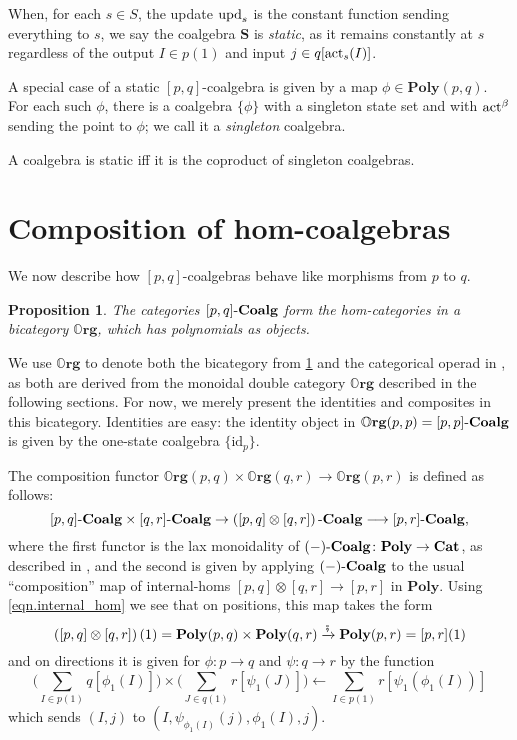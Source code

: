 \documentclass[11pt, one side, article]{memoir}
\theoremstyle{definition}
\theoremstyle{plain}
\newtheorem{proposition}[definitionx]{Proposition}
\newenvironment{example}
  {\pushQED{\qed}\renewcommand{\qedsymbol}{$\lozenge$}\examplex}
  {\popQED\endexamplex}
\newcommand{\Cat}[1]{\mathbf{#1}}%
\newcommand{\id}{\mathrm{id}}
\newcommand{\then}{\mathbin{\fatsemi}}
\newcommand{\too}{\longrightarrow}
\newcommand{\To}[2][]{\xrightarrow[#1]{#2}}
\newcommand{\from}{\leftarrow}
\newcommand{\tn}[1]{\textnormal{#1}}
\newcommand{\smcat}{\Cat{Cat}}
\newcommand{\act}{\tn{act}}
\newcommand{\upd}{\tn{upd}}
\newcommand{\poly}{\Cat{Poly}}
\newcommand{\0}{\textsf{0}}
\newcommand{\1}{\tn{\textsf{1}}}
\newcommand{\coalg}{\tn{-}\Cat{Coalg}}
\newcommand{\org}{{\mathbb{O}\Cat{rg}}}
\renewcommand{\S}{{\Cat{S}}}
\newcommand{\idcoalg}[1]{{\{\id_{#1}\}}}
\newcommand{\dnote}[1]{{\color{blue}David says:}~#1\quad{\color{blue}$\lozenge$}}
\begin{document}
When, for each $s \in S$, the update $\upd_s$ is the constant function sending everything to $s$, we say the coalgebra $\S$ is \emph{static}, as it remains constantly at $s$ regardless of the output $I \in p(1)$ and input $j\in q[\act_s(I)]$.

\begin{example}\label{ex.single_state}
A special case of a static $[p,q]$-coalgebra is given by a map $\phi \in \poly(p,q)$. For each such $\phi$, there is a coalgebra $\{\phi\}$ with a singleton state set and with $\act^\beta$ sending the point to $\phi$; we call it a \emph{singleton} coalgebra. 

A coalgebra is static iff it is the coproduct of singleton coalgebras.
\end{example}


\section{Composition of hom-coalgebras}\label{sec.compose_hom_coalg}



We now describe how $[p,q]$-coalgebras behave like morphisms from $p$ to $q$.

\begin{proposition}\label{prop.def_org}
The categories $[p,q]\coalg$ form the hom-categories in a bicategory $\org$, which has polynomials as objects.
\end{proposition}

We use $\org$ to denote both the bicategory from \cref{prop.def_org} and the categorical operad in \cite[Definition 2.19]{spivak2021learners}, as both are derived from the monoidal double category $\org$ described in the following sections. For now, we merely present the identities and composites in this bicategory. Identities are easy: the identity object in $\org(p,p)=[p,p]\coalg$ is given by the one-state coalgebra $\idcoalg{p}$. 

The composition functor $\org(p,q)\times\org(q,r)\too\org(p,r)$ is defined as follows:
\[[p,q]\coalg \times [q,r]\coalg \to \left([p,q] \otimes [q,r]\right)\coalg \too [p,r]\coalg,\]
where the first functor is the lax monoidality of $(-)\coalg\colon\poly \to \smcat$, as described in \cite[Proposition 2.13]{spivak2021learners}, and the second is given by applying $(-)\coalg$ to the usual ``composition'' map of internal-homs $[p,q] \otimes [q,r] \to [p,r]$ in $\poly$. Using \eqref{eqn.internal_hom} we see that on positions, this map takes the form\vspace{-.1cm}
\[\left([p,q] \otimes [q,r]\right)(1) = \poly(p,q) \times \poly(q,r) \To{\then} \poly(p,r) = [p,r](1)\]
and on directions it is given for $\phi\colon p \to q$ and $\psi\colon q \to r$ by the function
\[\bigg(\sum_{I \in p(1)} q[\phi_1(I)]\bigg) \times \bigg(\sum_{J \in q(1)} r[\psi_1(J)]\bigg) \from \sum_{I \in p(1)} r[\psi_1(\phi_1(I))]\]
which sends $(I,j)$ to $(I,\psi_{\phi_1(I)}(j),\phi_1(I),j)$. 
\end{document}
